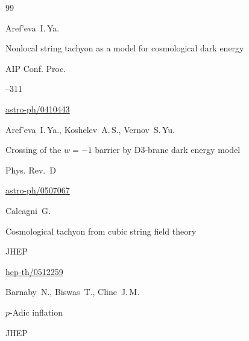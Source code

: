\begin{thebibliography}{99}


\by Aref'eva~I.\,Ya. 

\paper Nonlocal string tachyon as a model for cosmological dark energy


\jour AIP Conf. Proc.


--311

\arxiv \href{http://arxiv.org/abs/astro-ph/0410443}{astro-ph/0410443}







\by  Aref'eva~I.\,Ya.,  Koshelev~A.\,S.,  Vernov~S.\,Yu.

\paper Crossing of the $w=-1$ barrier by D3-brane dark energy model

\jour Phys. Rev.~D





\arxiv \href{http://arxiv.org/abs/astro-ph/0507067}{astro-ph/0507067}







\by   Calcagni~G.

\paper Cosmological tachyon from cubic string field theory

\jour JHEP 





\arxiv \href{http://arxiv.org/abs/hep-th/0512259}{hep-th/0512259}





\by  Barnaby~N., Biswas~T.,  Cline~J.\,M.

\paper $p$-Adic inflation

\jour JHEP 



\end{thebibliography}

